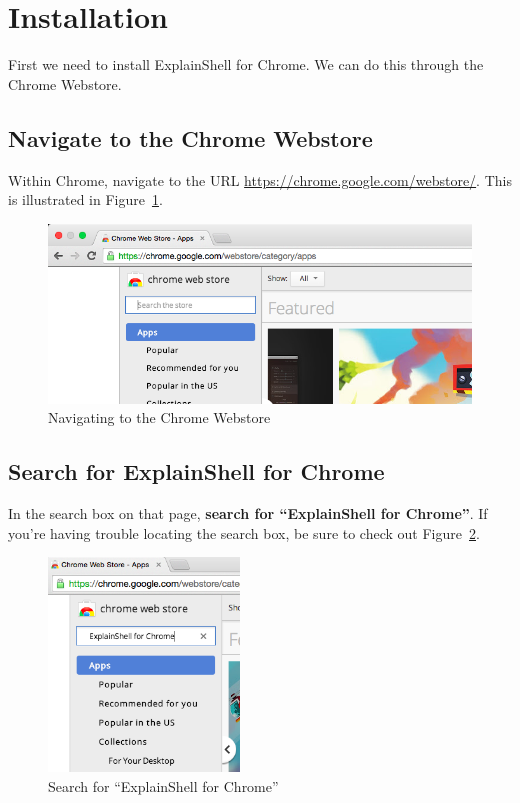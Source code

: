 \documentclass[11pt]{article}
\begin{document}
\newpage

\section{Installation}
First we need to install ExplainShell for Chrome. We can do this through the Chrome Webstore.

\subsection{Navigate to the Chrome Webstore}
Within Chrome, navigate to the URL \url{https://chrome.google.com/webstore/}. This is illustrated in Figure~\ref{chrome-webstore}.

\vspace{0.2in}
\begin{figure}[H]
  \begin{center}
    \includegraphics[width=\textwidth,height=\textheight,keepaspectratio]{01chrome-webstore}
  \end{center}
  \caption{Navigating to the Chrome Webstore}
  \label{chrome-webstore}
\end{figure}
\vspace{0.2in}

\subsection{Search for ExplainShell for Chrome}
In the search box on that page, \textbf{search for ``ExplainShell for Chrome''}. If you're having trouble locating the search box, be sure to check out Figure~\ref{search-box}.

\vspace{0.2in}
\begin{figure}[H]
  \begin{center}
    \includegraphics[width=2in, keepaspectratio]{02search-box}
  \end{center}
  \caption{Search for ``ExplainShell for Chrome''}
  \label{search-box}
\end{figure}
\vspace{0.2in}
\end{document}
